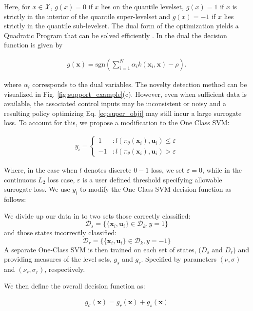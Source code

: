 \documentclass[10pt, conference]{ieeeconf}      %
\newcommand{\bu}{\mathbf{u}}
\newcommand{\bx}{\mathbf{x}}
\begin{document}
Here, for $x\in \mathcal{X}$, $g(x)=0$ if $x$ lies on the quantile levelset,
$g(x) = 1$ if $x$ is strictly in the interior of the quantile super-levelset and $g(x) = -1$ 
if $x$ lies strictly in the quantile sub-levelset. The dual form of the optimization yields a Quadratic Program 
that can be solved efficiently \cite{scholkopf2001estimating}. In the dual the decision function is given by 

\vspace{-2ex}
\begin{align}
g(\bx) = \mbox{sgn}(\sum^N_{i=1}\alpha_i k(\bx_i,\bx)-\rho).
\end{align}

where $\alpha_i$ corresponds to the dual variables.  The novelty detection method can be visualized in Fig. \ref{fig:support_example}(c). 
However, even when sufficient data is available, the associated control inputs may be inconsistent or noisy and a resulting policy
optimizing Eq. \ref{eq:super_objj} may still incur a large surrogate loss. To account for this, we propose a
modification to the One Class SVM:

\begin{align}
y_i = \left\{
     \begin{array}{lr}
         1 & : l(\pi_{\theta}(\bx_i),\bu_i)\le \varepsilon\\
         -1 & : l(\pi_{\theta}(\bx_i),\bu_i)>\varepsilon
     \end{array}
   \right.
\end{align}

Where, in the case when $l$ denotes discrete $0-1$ loss, we set $\varepsilon = 0$, while in the continuous $L_2$ loss
case, $\varepsilon$ is a user defined threshold specifying allowable surrogate loss.
We use $y_i$ to modify the One Class SVM decision function as follows: 


We divide up our data in to two sets those correctly classified:
$$\mathcal{D}_{s}=\{\lbrace \bx_i,\bu_i \rbrace \in \mathcal{D}_{k}, y=1\}$$
and those states incorrectly classified: 
$$\mathcal{D}_{r}=\{\lbrace \bx_i,\bu_i \rbrace \in \mathcal{D}_{k}, y=-1\}$$
A separate One-Class SVM is then trained on each set of states, ($D_{s}$ and $D_{r}$) and providing measures of the level sets, $g_{s}$ and $g_{r}$. Specified by parameters $(\nu,\sigma)$ and $(\nu_r,\sigma_r)$, respectively. 

We then define the overall decision function as:

\vspace{-2ex}
\begin{align}\label{eq:decision_func}
g_{\sigma}(\bx) = g_{r} (\bx)+ g_{s}(\bx)
\end{align}
\end{document}

